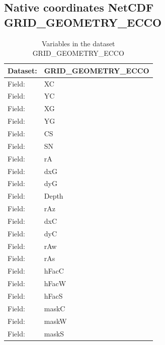 \pagebreak
\subsection{Native coordinates NetCDF GRID\_GEOMETRY\_ECCO}
\newp
\begin{longtable}{|p{}|p{}|}
    \caption{Variables in the dataset GRID\_GEOMETRY\_ECCO}
    \label{tab:table-GRID_GEOMETRY_ECCO-fields} \\ 
    \hline \endhead \hline \endfoot
    \rowcolor{lightgray} \textbf{Dataset:} & \textbf{GRID\_GEOMETRY\_ECCO} \\ \hline
    Field: &XC \\ \hline
    Field: &YC \\ \hline
    Field: &XG \\ \hline
    Field: &YG \\ \hline
    Field: &CS \\ \hline
    Field: &SN \\ \hline
    Field: &rA \\ \hline
    Field: &dxG \\ \hline
    Field: &dyG \\ \hline
    Field: &Depth \\ \hline
    Field: &rAz \\ \hline
    Field: &dxC \\ \hline
    Field: &dyC \\ \hline
    Field: &rAw \\ \hline
    Field: &rAs \\ \hline
    Field: &hFacC \\ \hline
    Field: &hFacW \\ \hline
    Field: &hFacS \\ \hline
    Field: &maskC \\ \hline
    Field: &maskW \\ \hline
    Field: &maskS \\ \hline
\end{longtable}

\pagebreak

